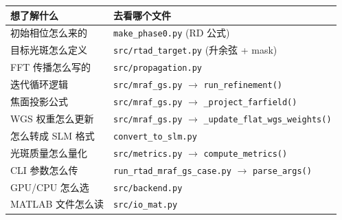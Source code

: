 \documentclass[11pt,a4paper]{ctexart}
\begin{document}
\begin{center}
\begin{tabular}{p{}p{}}
\toprule
\textbf{想了解什么} & \textbf{去看哪个文件} \\
\midrule
初始相位怎么来的         & \texttt{make\_phase0.py} (RD 公式) \\
目标光斑怎么定义         & \texttt{src/rtad\_target.py} (升余弦 + mask) \\
FFT 传播怎么写的         & \texttt{src/propagation.py} \\
迭代循环逻辑             & \texttt{src/mraf\_gs.py} $\rightarrow$ \texttt{run\_refinement()} \\
焦面投影公式             & \texttt{src/mraf\_gs.py} $\rightarrow$ \texttt{\_project\_farfield()} \\
WGS 权重怎么更新         & \texttt{src/mraf\_gs.py} $\rightarrow$ \texttt{\_update\_flat\_wgs\_weights()} \\
怎么转成 SLM 格式        & \texttt{convert\_to\_slm.py} \\
光斑质量怎么量化         & \texttt{src/metrics.py} $\rightarrow$ \texttt{compute\_metrics()} \\
CLI 参数怎么传           & \texttt{run\_rtad\_mraf\_gs\_case.py} $\rightarrow$ \texttt{parse\_args()} \\
GPU/CPU 怎么选           & \texttt{src/backend.py} \\
MATLAB 文件怎么读        & \texttt{src/io\_mat.py} \\
\bottomrule
\end{tabular}
\end{center}
\end{document}
